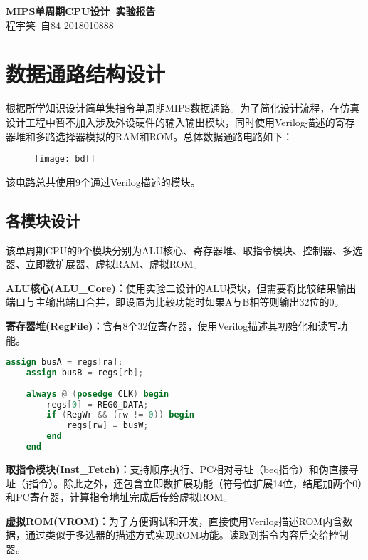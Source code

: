 \documentclass{hfutpaper}
\begin{document}
\begin{center}
\LARGE
  \textbf{MIPS单周期CPU设计\ 实验报告}\\
  \vspace{0.2em}
  \large
    程宇笑\ 自84 2018010888
  \end{center}
  

\section{数据通路结构设计}

\par 根据所学知识设计简单集指令单周期MIPS数据通路。为了简化设计流程，在仿真设计工程中暂不加入涉及外设硬件的输入输出模块，同时使用Verilog描述的寄存器堆和多路选择器模拟的RAM和ROM。总体数据通路电路如下：

\begin{figure}[H]
	\centering
	\texttt{[image: bdf]}
\end{figure}

\par 该电路总共使用9个通过Verilog描述的模块。

\subsection{各模块设计}

\par 该单周期CPU的9个模块分别为ALU核心、寄存器堆、取指令模块、控制器、多选器、立即数扩展器、虚拟RAM、虚拟ROM。
\par \textbf{ALU核心(ALU\_Core)：}使用实验二设计的ALU模块，但需要将比较结果输出端口与主输出端口合并，即设置为比较功能时如果A与B相等则输出32位的0。
\par \textbf{寄存器堆(RegFile)：}含有8个32位寄存器，使用Verilog描述其初始化和读写功能。

\begin{lstlisting}[language=verilog]
	assign busA = regs[ra];
	assign busB = regs[rb];
	
	always @ (posedge CLK) begin
		regs[0] = REG0_DATA;
		if (RegWr && (rw != 0)) begin
			regs[rw] = busW;
		end
	end
\end{lstlisting}

\par \textbf{取指令模块(Inst\_Fetch)：}支持顺序执行、PC相对寻址（beq指令）和伪直接寻址（j指令）。除此之外，还包含立即数扩展功能（符号位扩展14位，结尾加两个0）和PC寄存器，计算指令地址完成后传给虚拟ROM。
\par \textbf{虚拟ROM(VROM)：}为了方便调试和开发，直接使用Verilog描述ROM内含数据，通过类似于多选器的描述方式实现ROM功能。读取到指令内容后交给控制器。
\end{document}
